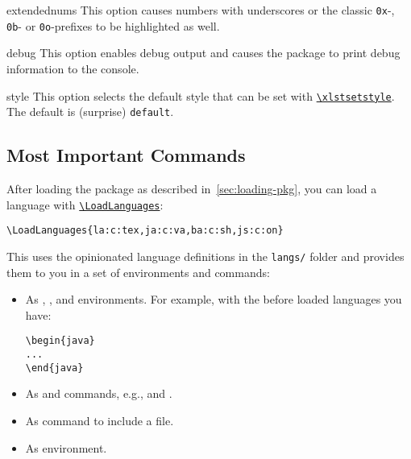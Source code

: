 \documentclass[10pt,DIV=12]{scrartcl}
\let\T\texttt
\def\cmdref#1{\hyperref[arg:#1]{\T{\xlstGetStyle{command}\textbackslash #1}}}
\begin{document}
\begin{argument}{extendednums}
    This option causes numbers with underscores or the classic \T{0x}-, \T{0b}- or \T{0o}-prefixes to be highlighted as well.
\end{argument}

\begin{argument}{debug}
    This option enables debug output and causes the package to print debug information to the console.
\end{argument}

\begin{argument}[string, ]{style}
    This option selects the default style that can be set with \cmdref{xlstsetstyle}. The default is (surprise) \T{default}.
\end{argument}

\subsection{Most Important Commands}

After loading the package as described in~\cref{sec:loading-pkg},
you can load a language with \cmdref{LoadLanguages}:
\begin{verbatim}
\LoadLanguages{la:c:tex,ja:c:va,ba:c:sh,js:c:on}
\end{verbatim}
This uses the opinionated language definitions in the \T{langs/} folder and provides them to you in a set of environments and commands:
\begin{itemize}[nosep]
    \item As , , and  environments. For example, with the before loaded languages you have:
\begin{verbatim}
\begin{java}
...
\end{java}
\end{verbatim}
    \item As  and  commands, e.g.,  and .
    \item As  command to include a file.
    \item As  environment.
\end{itemize}
\end{document}
